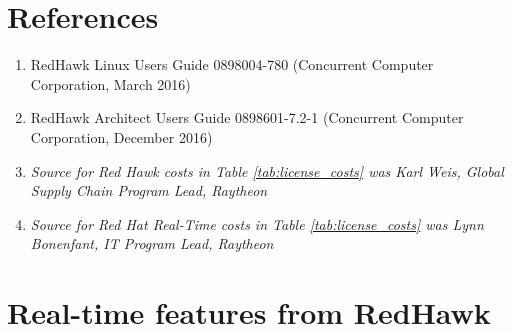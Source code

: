 \documentclass[12pt]{article}
\begin{document}
%
\section{References}

\begin{enumerate}
    \item RedHawk Linux Users Guide 0898004-780 (Concurrent Computer Corporation, March 2016) \label{ref:red_hawk_guide}
    \item RedHawk Architect Users Guide  0898601-7.2-1 (Concurrent Computer Corporation, December 2016) \label{ref:architect}
    \item \textit{Source for Red Hawk costs in Table \ref{tab:license_costs} was Karl Weis, Global Supply Chain Program Lead, Raytheon}
    \item \textit{Source for Red Hat Real-Time costs in Table \ref{tab:license_costs} was Lynn Bonenfant, IT Program Lead, Raytheon}
\end{enumerate}


%
\section{Real-time features from RedHawk}
\label{sec:redhawk_features}
\end{document}
